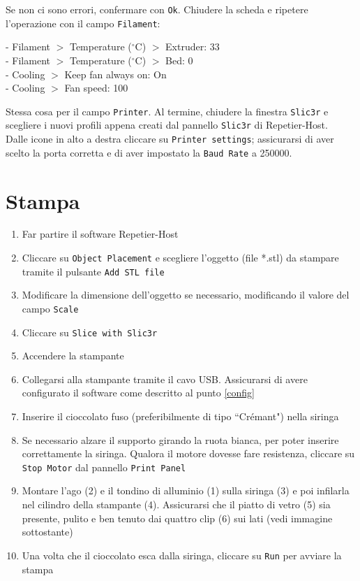 \documentclass[12pt]{article}
\begin{document}
		Se non ci sono errori, confermare con \texttt{Ok}. Chiudere la scheda e ripetere l'operazione con il campo \texttt{Filament}:

		- Filament $>$ Temperature ($^{\circ}$C) $>$ Extruder: 33\\
		- Filament $>$ Temperature ($^{\circ}$C) $>$ Bed: 0\\
		- Cooling $>$ Keep fan always on: On\\
		- Cooling $>$ Fan speed: 100
		
		Stessa cosa per il campo \texttt{Printer}. Al termine, chiudere la finestra \texttt{Slic3r} e scegliere i nuovi profili appena creati dal pannello \texttt{Slic3r} di Repetier-Host.\\
		
		Dalle icone in alto a destra cliccare su \texttt{Printer settings}; assicurarsi di aver scelto la porta corretta e di aver impostato la \texttt{Baud Rate} a 250000.


\section{Stampa}

	\begin{enumerate}
		\item Far partire il software Repetier-Host
	
		\item Cliccare su \texttt{Object Placement} e scegliere l'oggetto (file *.stl) da stampare tramite il pulsante \texttt{Add STL file}
	
		\item Modificare la dimensione dell'oggetto se necessario, modificando il valore del campo \texttt{Scale}

		\item Cliccare su \texttt{Slice with Slic3r}

		\item Accendere la stampante

		\item Collegarsi alla stampante tramite il cavo USB. Assicurarsi di avere configurato il software come descritto al punto \ref{config}

		\item Inserire il cioccolato fuso (preferibilmente di tipo ``Crémant") nella siringa
		
		\item Se necessario alzare il supporto girando la ruota bianca, per poter inserire correttamente la siringa. Qualora il motore dovesse fare resistenza, cliccare su \texttt{Stop Motor} dal pannello \texttt{Print Panel}

		\item Montare l'ago (2) e il tondino di alluminio (1) sulla siringa (3) e poi infilarla nel cilindro della stampante (4). Assicurarsi che il piatto di vetro (5) sia presente, pulito e ben tenuto dai quattro clip (6) sui lati (vedi immagine sottostante)

		\item Una volta che il cioccolato esca dalla siringa, cliccare su \texttt{Run} per avviare la stampa
	\end{enumerate}
\end{document}
